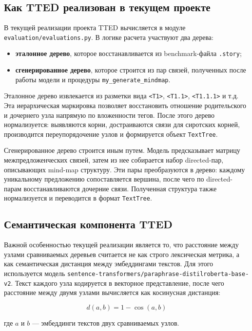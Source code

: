 \documentclass[12pt,a4paper]{article}
\begin{document}
\subsection{Как TTED реализован в текущем проекте}

В текущей реализации проекта TTED вычисляется в модуле
\texttt{evaluation/evaluations.py}. В логике расчета участвуют два дерева:

\begin{itemize}
    \item \textbf{эталонное дерево}, которое восстанавливается из benchmark-файла
    \texttt{.story};
    \item \textbf{сгенерированное дерево}, которое строится из пар связей, полученных
    после работы модели и процедуры \texttt{my\_generate\_mindmap}.
\end{itemize}

Эталонное дерево извлекается из разметки вида \texttt{<T1>}, \texttt{<T1.1>},
\texttt{<T1.1.1>} и т.д. Эта иерархическая маркировка позволяет восстановить отношение
родительского и дочернего узла напрямую по вложенности тегов. После этого дерево
нормализуется: выявляются корни, достраиваются связи для сиротских корней, производится
переупорядочение узлов и формируется объект \texttt{TextTree}.

Сгенерированное дерево строится иным путем. Модель предсказывает матрицу межпредложенческих
связей, затем из нее собирается набор directed-пар, описывающих mind-map структуру. Эти
пары преобразуются в дерево: каждому уникальному предложению сопоставляется вершина, после
чего по directed-парам восстанавливаются дочерние связи. Полученная структура также
нормализуется и переводится в формат \texttt{TextTree}.

\subsection{Семантическая компонента TTED}

Важной особенностью текущей реализации является то, что расстояние между узлами
сравниваемых деревьев считается не как строго лексическая метрика, а как семантическая
дистанция между эмбеддингами текстов. Для этого используется модель
\texttt{sentence-transformers/paraphrase-distilroberta-base-v2}. Текст каждого узла
кодируется в векторное представление, после чего расстояние между двумя узлами
вычисляется как косинусная дистанция:

\[
d(a, b) = 1 - \cos(a, b)
\]

где $a$ и $b$ --- эмбеддинги текстов двух сравниваемых узлов.
\end{document}
